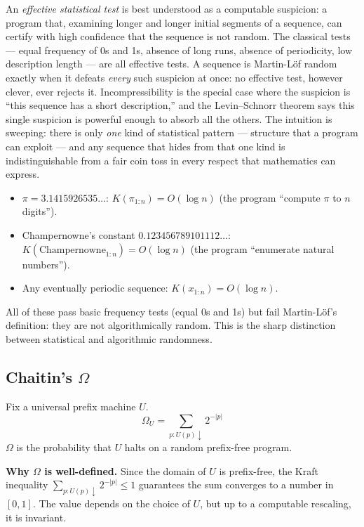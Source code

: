 An \emph{effective statistical test} is best understood as a computable suspicion: a program that, examining longer and longer initial segments of a sequence, can certify with high confidence that the sequence is not random. The classical tests --- equal frequency of 0s and 1s, absence of long runs, absence of periodicity, low description length --- are all effective tests. A sequence is Martin-L\"of random exactly when it defeats \emph{every} such suspicion at once: no effective test, however clever, ever rejects it. Incompressibility is the special case where the suspicion is ``this sequence has a short description,'' and the Levin--Schnorr theorem says this single suspicion is powerful enough to absorb all the others. The intuition is sweeping: there is only \emph{one} kind of statistical pattern --- structure that a program can exploit --- and any sequence that hides from that one kind is indistinguishable from a fair coin toss in every respect that mathematics can express.

\begin{example}
\begin{itemize}
\item $\pi = 3.1415926535\ldots$: $K(\pi_{1:n}) = O(\log n)$ (the program ``compute $\pi$ to $n$ digits'').
\item Champernowne's constant $0.123456789101112\ldots$: $K(\text{Champernowne}_{1:n}) = O(\log n)$ (the program ``enumerate natural numbers'').
\item Any eventually periodic sequence: $K(x_{1:n}) = O(\log n)$.
\end{itemize}
All of these pass basic frequency tests (equal 0s and 1s) but fail Martin-L\"of's definition: they are not algorithmically random. This is the sharp distinction between statistical and algorithmic randomness.
\end{example}

\subsection{Chaitin's \texorpdfstring{$\Omega$}{Ω}}
\label{sec:kolmogorov:omega}

\begin{definition}
Fix a universal prefix machine $U$. 
\[
\Omega_U = \sum_{p: U(p) \downarrow} 2^{-|p|}
\]
$\Omega$ is the probability that $U$ halts on a random prefix-free program.
\end{definition}

\textbf{Why $\Omega$ is well-defined.} Since the domain of $U$ is prefix-free, the Kraft inequality $\sum_{p: U(p)\downarrow} 2^{-|p|} \le 1$ guarantees the sum converges to a number in $[0,1]$. The value depends on the choice of $U$, but up to a computable rescaling, it is invariant.

